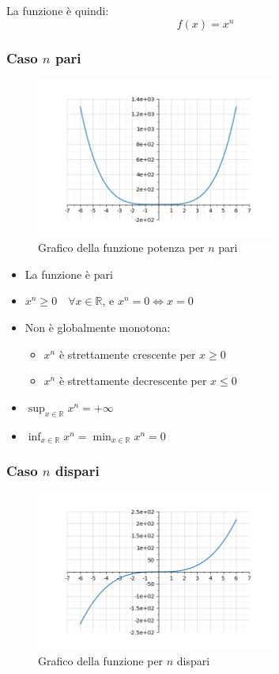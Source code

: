 \documentclass[oneside,10pt]{book} %
\begin{document}
La funzione è quindi:
\[
f(x) = x^n
\]

\subsubsection{Caso $n$ pari}
\begin{figure}[H]
    \centering
    \includegraphics[width=0.7\textwidth]{./img/esponente_pari.png}
    \caption{Grafico della funzione potenza per $n$ pari}
    \label{fig:esponente_pari}
\end{figure}
\FloatBarrier{}

\begin{itemize}
  \item La funzione è pari
  \item $x^n \geq 0 \quad \forall x \in \mathbb{R}$, e $x^n = 0 \iff x = 0$
  \item Non è globalmente monotona:
  \begin{itemize}
    \item $x^n$ è strettamente crescente per $x \geq 0$
    \item $x^n$ è strettamente decrescente per $x \leq 0$
  \end{itemize}
  \item $\displaystyle \sup_{x \in \mathbb{R}} x^n = +\infty$
  \item $\displaystyle \inf_{x \in \mathbb{R}} x^n = \min_{x \in \mathbb{R}} x^n = 0$
\end{itemize}


\subsubsection{Caso $n$ dispari}

\begin{figure}[H]
    \centering
    \includegraphics[width=0.7\textwidth]{./img/esponente_dispari.png}
    \caption{Grafico della funzione per $n$ dispari}
    \label{fig:esponente_dispari}
\end{figure}
\FloatBarrier
  
\end{document}
